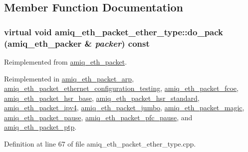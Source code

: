 \subsection{Member Function Documentation}
\hypertarget{classamiq__eth__packet__ether__type_a62fe5f26a466f0bd0045599b89aa6926}{
\subsubsection[{do\_\-pack}]{\setlength{\rightskip}{0pt plus 5cm}virtual void amiq\_\-eth\_\-packet\_\-ether\_\-type::do\_\-pack ({\bf amiq\_\-eth\_\-packer} \& {\em packer}) const}}
\label{classamiq__eth__packet__ether__type_a62fe5f26a466f0bd0045599b89aa6926}


Reimplemented from \hyperlink{classamiq__eth__packet_ab580d89fb44208f5a0fe31443619473e}{amiq\_\-eth\_\-packet}.

Reimplemented in \hyperlink{classamiq__eth__packet__arp_aa0919231910bf804ffafd9b1b771785f}{amiq\_\-eth\_\-packet\_\-arp}, \hyperlink{classamiq__eth__packet__ethernet__configuration__testing_a4ae6c0485066d7661170544fa64c7e49}{amiq\_\-eth\_\-packet\_\-ethernet\_\-configuration\_\-testing}, \hyperlink{classamiq__eth__packet__fcoe_ae119ce0a219ea22eef14da61262afbb7}{amiq\_\-eth\_\-packet\_\-fcoe}, \hyperlink{classamiq__eth__packet__hsr__base_a6dc22f94409c889f248908b1454af8b0}{amiq\_\-eth\_\-packet\_\-hsr\_\-base}, \hyperlink{classamiq__eth__packet__hsr__standard_a1dce9b763e3222c2fe257b15df912514}{amiq\_\-eth\_\-packet\_\-hsr\_\-standard}, \hyperlink{classamiq__eth__packet__ipv4_a8130e24da66bbd16c4edc7b6a608a5e9}{amiq\_\-eth\_\-packet\_\-ipv4}, \hyperlink{classamiq__eth__packet__jumbo_a1f2906c7128a79c356e152368584d2e8}{amiq\_\-eth\_\-packet\_\-jumbo}, \hyperlink{classamiq__eth__packet__magic_ad026a187c1d882aa1698a3b0d4209472}{amiq\_\-eth\_\-packet\_\-magic}, \hyperlink{classamiq__eth__packet__pause_aaea61c8cafc5274eac5d2b5428876868}{amiq\_\-eth\_\-packet\_\-pause}, \hyperlink{classamiq__eth__packet__pfc__pause_ac06dfc3d16b73113bbd42460ddbc9c4b}{amiq\_\-eth\_\-packet\_\-pfc\_\-pause}, and \hyperlink{classamiq__eth__packet__ptp_a5d415af5fcb6ed2cb603aaf0105fdd43}{amiq\_\-eth\_\-packet\_\-ptp}.

Definition at line 67 of file amiq\_\-eth\_\-packet\_\-ether\_\-type.cpp.


